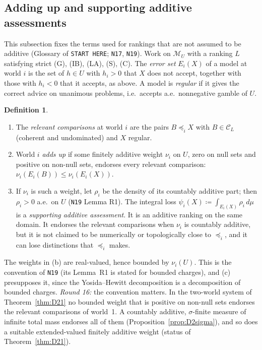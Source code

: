 \documentclass[11pt]{article}
\theoremstyle{definition}
\newtheorem{definition}[theorem]{Definition}
\theoremstyle{remark}
\newcommand{\M}{\mathcal M}
\newcommand{\C}{\mathcal C}
\newcommand{\src}[1]{\texttt{#1}}
\begin{document}
\subsection{Adding up and supporting additive assessments}\label{sec:addup-def}
This subsection fixes the terms used for rankings that are not assumed to be additive (Glossary of \src{START HERE}; \src{N17}, \src{N19}). Work on $\M_U$ with a ranking $L$ satisfying strict (G), (IB), (LA), (S), (C). The \emph{error set} $E_i(X)$ of a model at world $i$ is the set of $h\in U$ with $h_i>0$ that $X$ does not accept, together with those with $h_i<0$ that it accepts, as above. A model is \emph{regular} if it gives the correct advice on unanimous problems, i.e.\ accepts a.e.\ nonnegative gamble of $U$.

\begin{definition}\label{def:addup}
\begin{enumerate}[leftmargin=*,label=(\alph*)]
\item The \emph{relevant comparisons} at world $i$ are the pairs $B\preceq_iX$ with $B\in\C_L$ (coherent and undominated) and $X$ regular.
\item World $i$ \emph{adds up} if some finitely additive weight $\nu_i$ on $U$, zero on null sets and positive on non-null sets, endorses every relevant comparison: $\nu_i(E_i(B))\le\nu_i(E_i(X))$.
\item If $\nu_i$ is such a weight, let $\rho_i$ be the density of its countably additive part; then $\rho_i>0$ a.e.\ on $U$ (\src{N19} Lemma R1). The integral loss $\psi_i(X)\coloneqq\int_{E_i(X)}\rho_i\,d\mu$ is a \emph{supporting additive assessment}. It is an additive ranking on the same domain. It endorses the relevant comparisons when $\nu_i$ is countably additive, but it is not claimed to be numerically or topologically close to $\preceq_i$, and it can lose distinctions that $\preceq_i$ makes.
\end{enumerate}
\end{definition}

The weights in (b) are real-valued, hence bounded by $\nu_i(U)$. This is the convention of \src{N19} (its Lemma~R1 is stated for bounded charges), and (c) presupposes it, since the Yosida--Hewitt decomposition is a decomposition of bounded charges. \emph{Round 16:} the convention matters. In the two-world system of Theorem~\ref{thm:D21} no bounded weight that is positive on non-null sets endorses the relevant comparisons of world~1. A countably additive, $\sigma$-finite measure of infinite total mass endorses all of them (Proposition~\ref{prop:D2sigma}), and so does a suitable extended-valued finitely additive weight (status of Theorem~\ref{thm:D21}).
\end{document}
